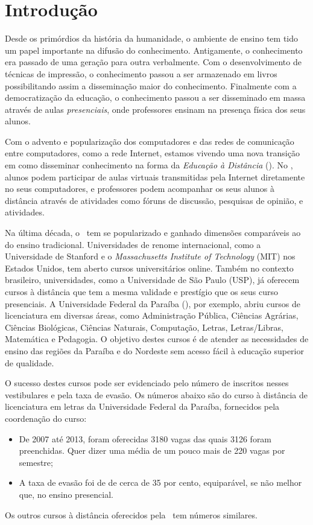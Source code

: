 \chapter{Introdução}


Desde os primórdios da história da humanidade, o ambiente de ensino tem tido um papel
importante na difusão do conhecimento. Antigamente, o conhecimento era passado de uma
geração para outra verbalmente. Com o desenvolvimento de técnicas de impressão, o conhecimento
passou a ser armazenado em livros possibilitando assim a disseminação maior do conhecimento. 
Finalmente com a democratização da educação, o conhecimento passou a ser disseminado em massa 
através de aulas \emph{presenciais}, onde professores ensinam na presença física dos seus alunos. 

Com o advento e popularização dos computadores e das redes de comunicação entre computadores, como a rede Internet, 
estamos vivendo uma nova transição em como disseminar conhecimento na forma da \emph{Educação à Distância} (\ead). 
No \ead, alunos podem participar de aulas virtuais transmitidas pela Internet diretamente no seus computadores, 
e professores podem acompanhar os seus alunos à distância através de atividades como 
fóruns de discussão, pesquisas de opinião, e atividades.

Na última década, o \ead\ tem se popularizado e ganhado dimensões comparáveis ao do ensino  
tradicional. Universidades de renome internacional, como a Universidade de Stanford e o \emph{Massachusetts Institute of 
Technology} (MIT) nos Estados Unidos, tem aberto cursos universitários online. Também no contexto brasileiro, 
universidades, como a Universidade de São Paulo (USP), já oferecem cursos 
à distância que tem a mesma validade e prestígio que os seus curso presenciais. 
A Universidade Federal da Paraíba (\ufpb), por exemplo, abriu cursos de licenciatura em 
diversas áreas, como Administração Pública, Ciências Agrárias, Ciências Biológicas, Ciências Naturais,
Computação, Letras, Letras/Libras, Matemática e Pedagogia. O objetivo destes cursos
é de atender as necessidades de ensino das regiões da Paraíba e do Nordeste sem acesso fácil
à educação superior de qualidade. 

O sucesso destes cursos pode ser evidenciado pelo número de inscritos nesses vestibulares e pela taxa de 
evasão. Os números abaixo são do curso à distância de licenciatura em letras da Universidade Federal da Paraíba, fornecidos pela 
coordenação do curso:
\begin{itemize}
 \item De 2007 até 2013, foram oferecidas 3180 vagas das quais 3126 foram preenchidas. 
 Quer dizer uma média de um pouco mais de 220 vagas por semestre;
 
 \item A taxa de evasão  foi de de cerca de 
35 por cento, equiparável, se não melhor que, no ensino presencial.
\end{itemize}
 Os outros cursos à distância oferecidos pela \ufpb\  tem números similares.

